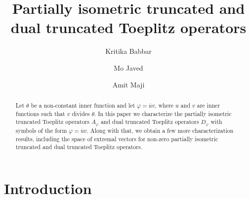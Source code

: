 \documentclass[12pt]{amsart}
\theoremstyle{definition}
\theoremstyle{plain}
\theoremstyle{definition}
\numberwithin{equation}{section}
\let\phi=\varphi
\begin{document}
\setcounter{page}{1}
	
\title[Partially isometric TTO and DTTO]{Partially isometric truncated and dual truncated Toeplitz operators}


\author[Babbar]{Kritika Babbar}
\address{Indian Institute of Technology Roorkee, Department of Mathematics,
		Roorkee-247 667, Uttarakhand,  India}
	
\author[Javed]{Mo Javed}
\address{Indian Institute of Technology Roorkee, Department of Mathematics,
		Roorkee-247 667, Uttarakhand,  India}

\author[Maji]{Amit Maji}
\address{Indian Institute of Technology Roorkee, Department of Mathematics,
		Roorkee-247 667, Uttarakhand,  India}



		

	
	
	
	
	
\begin{abstract}
Let $\theta$ be a non-constant inner function and let $\phi=\overline{u}v$, where $u$ and $v$ are inner functions such that $v$ divides $\theta$. In this paper we characterize the partially isometric truncated Toeplitz operators $A_{\phi}$ and dual truncated Toeplitz operators $D_{\phi}$ with symbols of the form $\phi=\overline{u}v$. Along with that, we obtain a few more characterization results, including the space of extremal vectors for non-zero partially isometric truncated and dual truncated Toeplitz operators.
\end{abstract}
	
\maketitle
	



\section{Introduction}
	
\end{document}
